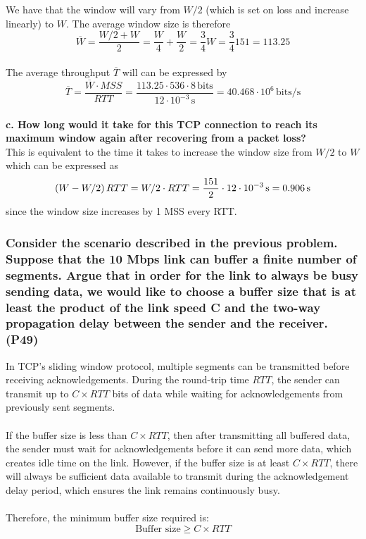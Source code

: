 We have that the window will vary from $W/2$ (which is set on loss and increase linearly) to $W$. The average window size is therefore 
\begin{equation*}
    \overline{W} = \frac{W/2 + W}{2} = \frac{W}{4} + \frac{W}{2} = \frac{3}{4} W = \frac{3}{4} 151 = 113.25
\end{equation*}
\\
The average throughput $\overline{T}$ will can be expressed by
\begin{equation*}
    \overline{T} = \frac{\overline{W} \cdot MSS}{RTT} = \frac{113.25 \cdot 536 \cdot 8 \, \text{bits}}{12 \cdot 10^{-3} \, \text{s}} = 40.468 \cdot 10^6 \, \text{bits/s}
\end{equation*}
\\
\textbf{c. How long would it take for this TCP connection to reach its maximum window again after recovering from a packet loss?} \\
This is equivalent to the time it takes to increase the window size from $W/2$ to $W$ which can be expressed as
\begin{equation*}
    \left (W - W/2\right) RTT = W/2 \cdot RTT  = \frac{151}{2} \cdot 12 \cdot 10^{-3} \, \text{s} = 0.906 \, \text{s}
\end{equation*}
since the window size increases by 1 MSS every RTT.

\subsubsection{Consider the scenario described in the previous problem. Suppose that the 10 Mbps link can buffer a finite number of segments. Argue that in order for the link to always be busy sending data, we would like to choose a buffer size that is at least the product of the link speed C and the two-way propagation delay between the sender and the receiver. (P49)}

In TCP's sliding window protocol, multiple segments can be transmitted before receiving acknowledgements. During the round-trip time $RTT$, the sender can transmit up to $C \times RTT$ bits of data while waiting for acknowledgements from previously sent segments. \\
\\
If the buffer size is less than $C \times RTT$, then after transmitting all buffered data, the sender must wait for acknowledgements before it can send more data, which creates idle time on the link. However, if the buffer size is at least $C \times RTT$, there will always be sufficient data available to transmit during the acknowledgement delay period, which ensures the link remains continuously busy.\\
\\
Therefore, the minimum buffer size required is:
$$\text{Buffer size} \geq C \times RTT$$

